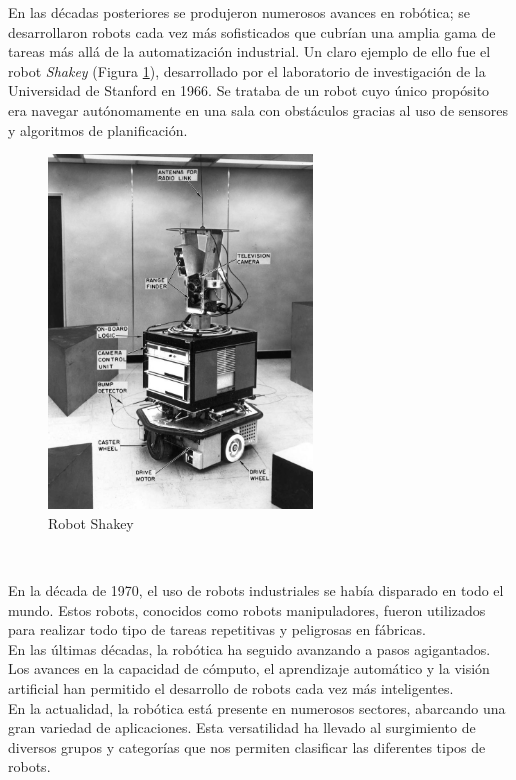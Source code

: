 En las décadas posteriores se produjeron numerosos avances en robótica; se desarrollaron robots cada vez más sofisticados que cubrían una amplia gama de tareas más allá de la 
automatización industrial. Un claro ejemplo de ello fue el robot \textit{Shakey} (Figura \ref{fig:shakey}), desarrollado por el laboratorio de investigación de la Universidad de Stanford en 1966. Se trataba 
de un robot cuyo único propósito era navegar autónomamente en una sala con obstáculos gracias al uso de sensores y algoritmos de planificación.\\
\begin{figure} [ht!]
  \begin{center}
    \includegraphics[width=7cm]{figs/shakey.jpg}
  \end{center}
  \caption{Robot Shakey}
  \label{fig:shakey}
\end{figure}\

En la década de 1970, el uso de robots industriales se había disparado en todo el mundo. Estos robots, conocidos como robots manipuladores, fueron utilizados para 
realizar todo tipo de tareas repetitivas y peligrosas en fábricas.
\\
En las últimas décadas, la robótica ha seguido avanzando a pasos agigantados. Los avances en la capacidad de cómputo, el aprendizaje automático y la visión 
artificial han permitido el desarrollo de robots cada vez más inteligentes.
\\
En la actualidad, la robótica está presente en numerosos sectores, abarcando una gran variedad de aplicaciones. Esta versatilidad ha llevado al surgimiento 
de diversos grupos y categorías que nos permiten clasificar las diferentes tipos de robots. 
\newpage

